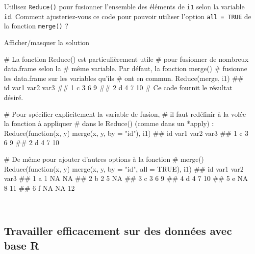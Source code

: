 \documentclass[12pt,]{article}
\newenvironment{Shaded}{}{}
\newcommand{\KeywordTok}[1]{\textcolor[rgb]{0.00,0.00,1.00}{{#1}}}
\newcommand{\DataTypeTok}[1]{{#1}}
\newcommand{\StringTok}[1]{\textcolor[rgb]{0.00,0.50,0.50}{{#1}}}
\newcommand{\CommentTok}[1]{\textcolor[rgb]{0.00,0.50,0.00}{{#1}}}
\newcommand{\OtherTok}[1]{\textcolor[rgb]{1.00,0.25,0.00}{{#1}}}
\newcommand{\NormalTok}[1]{{#1}}
\begin{document}
\begin{enumerate}
  Utilisez \texttt{Reduce()} pour fusionner l'ensemble des éléments de
  \texttt{i1} selon la variable \texttt{id}. Comment ajusteriez-vous ce
  code pour pouvoir utiliser l'option \texttt{all\ =\ TRUE} de la
  fonction \texttt{merge()} ?

  Afficher/masquer la solution

  \hypertarget{sol33}{}
\begin{Shaded}
\begin{Highlighting}[]
\CommentTok{# La fonction Reduce() est particulièrement utile }
\CommentTok{# pour fusionner de nombreux data.frame selon la}
\CommentTok{# même variable. Par défaut, la fonction merge()}
\CommentTok{# fusionne les data.frame sur les variables qu'ils}
\CommentTok{# ont en commun.}
\KeywordTok{Reduce}\NormalTok{(merge, i1)}
\NormalTok{##   id var1 var2 var3}
\NormalTok{## 1  c    3    6    9}
\NormalTok{## 2  d    4    7   10}
\CommentTok{# Ce code fournit le résultat désiré. }

\CommentTok{# Pour spécifier explicitement la variable de fusion, }
\CommentTok{# il faut redéfinir à la volée la fonction à appliquer }
\CommentTok{# dans le Reduce() (comme dans un *apply) : }
\KeywordTok{Reduce}\NormalTok{(function(x, y) }\KeywordTok{merge}\NormalTok{(x, y, }\DataTypeTok{by =} \StringTok{"id"}\NormalTok{), i1)}
\NormalTok{##   id var1 var2 var3}
\NormalTok{## 1  c    3    6    9}
\NormalTok{## 2  d    4    7   10}

\CommentTok{# De même pour ajouter d'autres options à la fonction }
\CommentTok{# merge()}
\KeywordTok{Reduce}\NormalTok{(function(x, y) }\KeywordTok{merge}\NormalTok{(x, y, }\DataTypeTok{by =} \StringTok{"id"}\NormalTok{, }\DataTypeTok{all =} \OtherTok{TRUE}\NormalTok{), i1)}
\NormalTok{##   id var1 var2 var3}
\NormalTok{## 1  a    1   NA   NA}
\NormalTok{## 2  b    2    5   NA}
\NormalTok{## 3  c    3    6    9}
\NormalTok{## 4  d    4    7   10}
\NormalTok{## 5  e   NA    8   11}
\NormalTok{## 6  f   NA   NA   12}
\end{Highlighting}
\end{Shaded}

  ~
\end{enumerate}

\subsection{\texorpdfstring{Travailler efficacement sur des données avec
base
\textbf{R}}{Travailler efficacement sur des données avec base R}}\label{travailler-efficacement-sur-des-donnees-avec-base-r}
\end{document}
